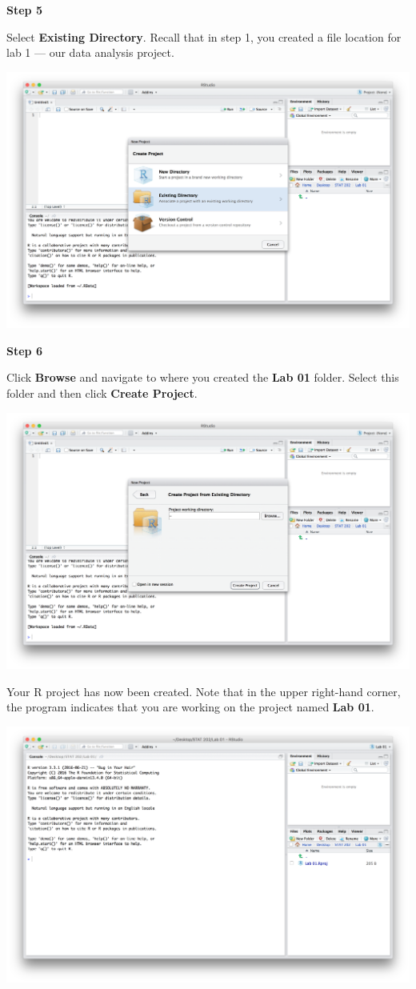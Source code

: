 \documentclass[]{book}
\theoremstyle{definition}
\theoremstyle{definition}
\theoremstyle{definition}
\theoremstyle{remark}
\begin{document}
\textbf{Step 5}

Select \textbf{Existing Directory}. Recall that in step 1, you created a
file location for lab 1 --- our data analysis project.

\includegraphics{./assets/images/01-03.png}

\textbf{Step 6}

Click \textbf{Browse} and navigate to where you created the \textbf{Lab
01} folder. Select this folder and then click \textbf{Create Project}.

\includegraphics{./assets/images/01-04.png}

Your R project has now been created. Note that in the upper right-hand
corner, the program indicates that you are working on the project named
\textbf{Lab 01}.

\includegraphics{./assets/images/01-05.png}
\end{document}
